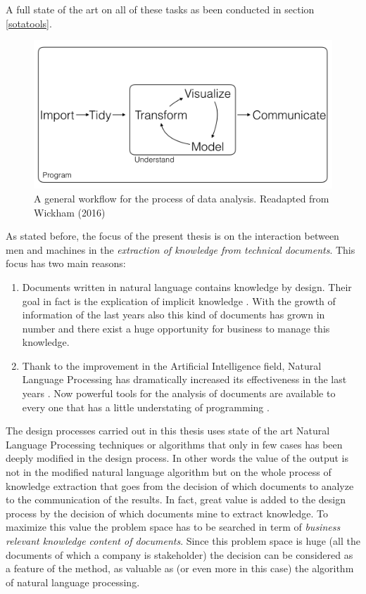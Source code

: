 \documentclass[]{book}
\theoremstyle{definition}
\theoremstyle{definition}
\theoremstyle{definition}
\theoremstyle{remark}
\begin{document}
A full state of the art on all of these tasks as been conducted in
section \ref{sotatools}.

\begin{figure}

{\centering \includegraphics[width=0.8\linewidth]{_bookdown_files/figures/main_work_flow} 

}

\caption{A general workflow for the process of data analysis. Readapted from Wickham (2016)}\label{fig:mainworkflow}
\end{figure}

As stated before, the focus of the present thesis is on the interaction
between men and machines in the \emph{extraction of knowledge from
technical documents}. This focus has two main reasons:

\begin{enumerate}
\def\labelenumi{\arabic{enumi}.}
\item
  Documents written in natural language contains knowledge by design.
  Their goal in fact is the explication of implicit knowledge
  \citep[\citet{graesser1985structures}]{masters1992knowledge}. With the
  growth of information of the last years also this kind of documents
  has grown in number and there exist a huge opportunity for business to
  manage this knowledge.
\item
  Thank to the improvement in the Artificial Intelligence field, Natural
  Language Processing has dramatically increased its effectiveness in
  the last years \citep{russell2016artificial}. Now powerful tools for
  the analysis of documents are available to every one that has a little
  understating of programming \citep[\citet{Kenneth2018spacyr},
  \citet{Wijffels2018udpipe}]{Taylor2017Tidy}.
\end{enumerate}

The design processes carried out in this thesis uses state of the art
Natural Language Processing techniques or algorithms that only in few
cases has been deeply modified in the design process. In other words the
value of the output is not in the modified natural language algorithm
but on the whole process of knowledge extraction that goes from the
decision of which documents to analyze to the communication of the
results. In fact, great value is added to the design process by the
decision of which documents mine to extract knowledge. To maximize this
value the problem space has to be searched in term of \emph{business
relevant knowledge content of documents}. Since this problem space is
huge (all the documents of which a company is stakeholder) the decision
can be considered as a feature of the method, as valuable as (or even
more in this case) the algorithm of natural language processing.
\end{document}
